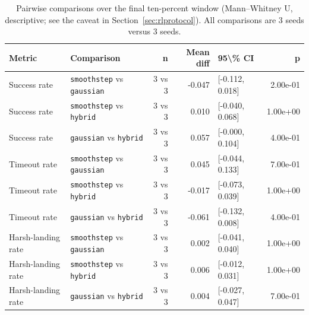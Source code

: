 \begin{table}[htb]
\centering
\caption{Pairwise comparisons over the final ten-percent window (Mann--Whitney U, descriptive; see the caveat in Section~\ref{sec:rlprotocol}). All comparisons are 3 seeds versus 3 seeds.}
\label{tab:rlstats}
\footnotesize
\setlength{\tabcolsep}{4pt}
\begin{tabular}{@{}llrrlr@{}}
\toprule
Metric & Comparison & n & Mean diff & 95\textbackslash{}\% CI & p \\
\midrule
Success rate & \texttt{smoothstep} vs \texttt{gaussian} & 3 vs 3 & -0.047 & [-0.112, 0.018] & 2.00e-01 \\
Success rate & \texttt{smoothstep} vs \texttt{hybrid} & 3 vs 3 & 0.010 & [-0.040, 0.068] & 1.00e+00 \\
Success rate & \texttt{gaussian} vs \texttt{hybrid} & 3 vs 3 & 0.057 & [-0.000, 0.104] & 4.00e-01 \\
Timeout rate & \texttt{smoothstep} vs \texttt{gaussian} & 3 vs 3 & 0.045 & [-0.044, 0.133] & 7.00e-01 \\
Timeout rate & \texttt{smoothstep} vs \texttt{hybrid} & 3 vs 3 & -0.017 & [-0.073, 0.039] & 1.00e+00 \\
Timeout rate & \texttt{gaussian} vs \texttt{hybrid} & 3 vs 3 & -0.061 & [-0.132, 0.008] & 4.00e-01 \\
Harsh-landing rate & \texttt{smoothstep} vs \texttt{gaussian} & 3 vs 3 & 0.002 & [-0.041, 0.040] & 1.00e+00 \\
Harsh-landing rate & \texttt{smoothstep} vs \texttt{hybrid} & 3 vs 3 & 0.006 & [-0.012, 0.031] & 1.00e+00 \\
Harsh-landing rate & \texttt{gaussian} vs \texttt{hybrid} & 3 vs 3 & 0.004 & [-0.027, 0.047] & 7.00e-01 \\
\bottomrule
\end{tabular}
\end{table}

